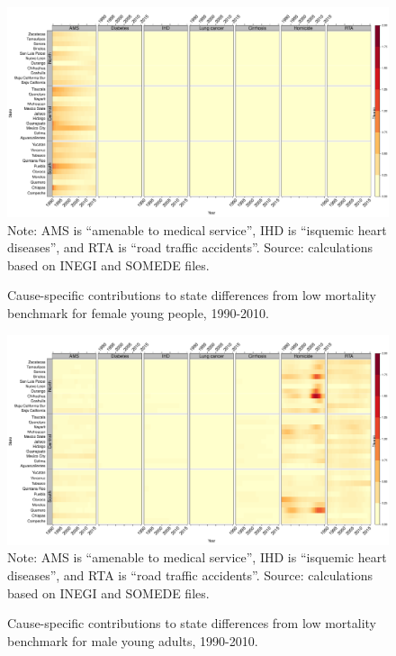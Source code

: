 \documentclass[11.5pt]{article}
\begin{document}
{\begin{figure}
\centering
\caption{Cause-specific contributions to state differences from low mortality benchmark for female young people, 1990-2010.}
\label{fig:e0_14_females}
\includegraphics[scale=.3]{Young_Female_heatmap.pdf}
Note: AMS is ``amenable to medical service'', IHD is ``isquemic heart diseases'', and RTA is ``road traffic accidents''. Source: calculations based on INEGI and SOMEDE files. \end{figure}



\begin{figure}
\centering
\caption{Cause-specific contributions to state differences from low mortality benchmark for male young adults, 1990-2010.}
\label{fig:e15_39_males}
\includegraphics[scale=.3]{YoungAdult_Male_heatmap.pdf}
Note: AMS is ``amenable to medical service'', IHD is ``isquemic heart diseases'', and RTA is ``road traffic accidents''. Source: calculations based on INEGI and SOMEDE files.
\end{figure}

}
\end{document}
